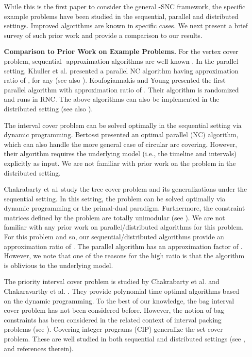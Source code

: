 \documentclass[11pt]{article}
\begin{document}
While this is the first paper to consider the general -SNC framework, the specific example
problems have been studied in the sequential, parallel and distributed settings.
Improved algorithms are known in specific cases.
We next present a brief survey of such prior work and provide a comparison to our results.

{\bf Comparison to Prior Work on Example Problems. }
For the vertex cover problem, sequential -approximation algorithms are well known \cite{ShmoysBook}.
In the parallel setting, Khuller et al. \cite{KVY} presented a parallel NC algorithm
having approximation ratio of , for any  (see also \cite{Gandhi}).
Koufogiannakis and Young \cite{Kouf-Young} presented the first parallel algorithm with approximation ratio of .
Their algorithm is randomized and runs in RNC.
The above algorithms can also be implemented in the distributed setting
(see also \cite{GKP}).


The interval cover problem can be solved optimally in the sequential setting via dynamic programming.
Bertossi \cite{Bertossi} presented an optimal parallel (NC) algorithm,
which can also handle the more general case of circular arc covering.
However, their algorithm requires the underlying model (i.e., the timeline and intervals) explicitly as input.
We are not familiar with prior work on the problem in the distributed setting.

Chakrabarty et al. \cite{CGK} study the tree cover problem and its generalizations under the sequential setting.
In this setting, the problem can be solved optimally via dynamic programming or the primal-dual paradigm.
Furthermore, the constraint matrices defined by the problem are totally unimodular (see \cite{CGK}).
We are not familiar with any prior work on parallel/distributed algorithms for this problem.
For this problem  and so, our sequential/distributed algorithms provide an approximation ratio of .
The parallel algorithm has an approximation factor of . However, we note that one of the reasons for the high
ratio is that the algorithm is oblivious to the underlying model.

The priority interval cover problem is studied by Chakrabarty et al. \cite{CGK} and Chakaravarthy et al. \cite{our-esa}. 
They provide polynomial time optimal algorithms based on the dynamic programming.
To the best of our knowledge, the bag interval cover problem has not been considered before.
However, the notion of bag constraints has been considered in the related context
of interval packing problems (see \cite{Bar-Noy-Jacm, Berman-Dasgupta}).
Covering integer programs (CIP) generalize the set cover problem.
These are well studied in both sequential and distributed settings (see \cite{Kouf-Young,CGK}, and references therein).
\end{document}
